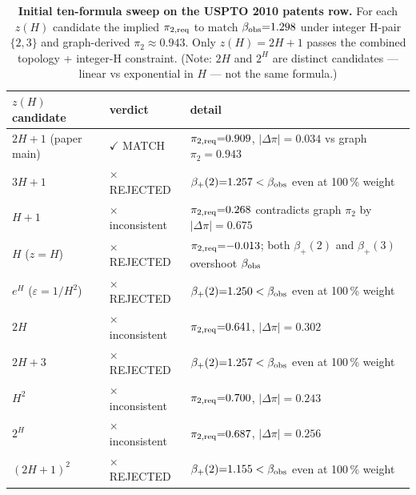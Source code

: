 \begin{table}[h]
\centering
\footnotesize
\caption{\textbf{Initial ten-formula sweep on the USPTO 2010 patents row.} For each \(z(H)\) candidate the implied \(\pi_{2,\rm req}\) to match \(\beta_{\rm obs}{=}1.298\) under integer H-pair \(\{2,3\}\) and graph-derived \(\pi_2{\approx}0.943\). Only \(z(H){=}2H{+}1\) passes the combined topology + integer-H constraint. (Note: \(2H\) and \(2^H\) are distinct candidates --- linear vs exponential in \(H\) --- not the same formula.)}
\label{tab:candidate_initial_sweep}
\renewcommand{\arraystretch}{1.05}
\begin{tabular}{l l l}
\toprule
\(z(H)\) candidate & verdict & detail \\
\midrule
\(2H{+}1\) (paper main)         & \(\checkmark\) MATCH        & \(\pi_{2,\rm req}{=}0.909\), \(|\Delta\pi|{=}0.034\) vs graph \(\pi_2{=}0.943\) \\
\(3H{+}1\)                       & \(\times\) REJECTED         & \(\beta_+(2){=}1.257 < \beta_{\rm obs}\) even at 100\,\% weight \\
\(H{+}1\)                        & \(\times\) inconsistent     & \(\pi_{2,\rm req}{=}0.268\) contradicts graph \(\pi_2\) by \(|\Delta\pi|{=}0.675\) \\
\(H\) (\(z{=}H\))                & \(\times\) REJECTED         & \(\pi_{2,\rm req}{=}{-}0.013\); both \(\beta_+(2)\) and \(\beta_+(3)\) overshoot \(\beta_{\rm obs}\) \\
\(e^H\) (\(\varepsilon{=}1/H^2\)) & \(\times\) REJECTED        & \(\beta_+(2){=}1.250 < \beta_{\rm obs}\) even at 100\,\% weight \\
\(2H\)                           & \(\times\) inconsistent     & \(\pi_{2,\rm req}{=}0.641\), \(|\Delta\pi|{=}0.302\) \\
\(2H{+}3\)                       & \(\times\) REJECTED         & \(\beta_+(2){=}1.257 < \beta_{\rm obs}\) even at 100\,\% weight \\
\(H^2\)                          & \(\times\) inconsistent     & \(\pi_{2,\rm req}{=}0.700\), \(|\Delta\pi|{=}0.243\) \\
\(2^H\)                          & \(\times\) inconsistent     & \(\pi_{2,\rm req}{=}0.687\), \(|\Delta\pi|{=}0.256\) \\
\((2H{+}1)^2\)                   & \(\times\) REJECTED         & \(\beta_+(2){=}1.155 < \beta_{\rm obs}\) even at 100\,\% weight \\
\bottomrule
\end{tabular}
\end{table}

